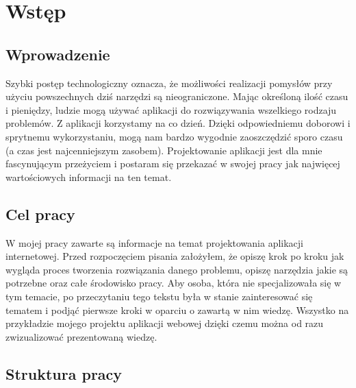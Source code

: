 \chapter{Wstęp}

\section{Wprowadzenie}
Szybki postęp technologiczny oznacza, że możliwości realizacji pomysłów przy użyciu powszechnych dziś narzędzi są nieograniczone. Mając określoną ilość czasu i pieniędzy, ludzie mogą używać aplikacji do rozwiązywania wszelkiego rodzaju problemów. Z aplikacji korzystamy na co dzień. Dzięki odpowiedniemu doborowi i sprytnemu wykorzystaniu, mogą nam bardzo wygodnie zaoszczędzić sporo czasu (a czas jest najcenniejszym zasobem). Projektowanie aplikacji jest dla mnie fascynującym przeżyciem i postaram się przekazać w swojej pracy jak najwięcej wartościowych informacji na ten temat.

\section{Cel pracy}
W mojej pracy zawarte są informacje na temat projektowania aplikacji internetowej. Przed rozpoczęciem pisania założyłem, że opiszę krok po kroku jak wygląda proces tworzenia rozwiązania danego problemu, opiszę narzędzia jakie są potrzebne oraz całe środowisko pracy. Aby osoba, która nie specjalizowała się w tym temacie, po przeczytaniu tego tekstu była w stanie zainteresować się tematem i podjąć pierwsze kroki w oparciu o zawartą w nim wiedzę. Wszystko na przykładzie mojego projektu aplikacji webowej dzięki czemu można od razu zwizualizować prezentowaną wiedzę.

\section{Struktura pracy}